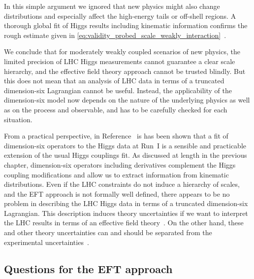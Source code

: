 In this simple argument we ignored that new physics might also change
distributions and especially affect the high-energy tails or off-shell
regions.
%
%
A thorough global fit of Higgs results including kinematic information
confirms the rough estimate given in
\autoref{eq:validity_probed_scale_weakly_interaction}~\cite{Corbett:2015ksa}.

We conclude that for moderately weakly coupled scenarios of new
physics, the limited precision of LHC Higgs measurements cannot
guarantee a clear scale hierarchy, and the effective field theory
approach cannot be trusted blindly. But this does not mean that an
analysis of LHC data in terms of a truncated dimension-six Lagrangian
cannot be useful. Instead, the applicability of the dimension-six
model now depends on the nature of the underlying physics as well as
on the process and observable, and has to be carefully checked for
each situation.

From a practical perspective, in Reference~\cite{Corbett:2015ksa} is has
been shown that a fit of dimension-six operators to the Higgs data at
Run~I is a sensible and practicable extension of the usual Higgs
couplings fit.  As discussed at length in the previous chapter,
dimension-six operators including derivatives complement the Higgs
coupling modifications and allow us to extract information from
kinematic distributions. Even if the LHC constraints do not induce a
hierarchy of scales, and the EFT approach is not formally well
defined, there appears to be no problem in describing the LHC Higgs
data in terms of a truncated dimension-six Lagrangian. This
description induces theory uncertainties if we want to interpret the
LHC results in terms of an effective field
theory~\cite{Berthier:2015gja}. On the other hand, these and other
theory uncertainties can and should be separated from the experimental
uncertainties~\cite{Cranmer:2013hia, Fichet:2015xla}.



\subsection{Questions for the EFT approach}

